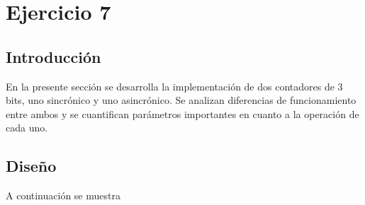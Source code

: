 \documentclass{article}
\begin{document}
\section{Ejercicio 7}

\subsection{Introducci\'on}
\noindent
En la presente sección se desarrolla la implementaci\'on de dos contadores de 3 bits, uno sincr\'onico y uno asincr\'onico. Se analizan diferencias de funcionamiento entre ambos y se cuantifican par\'ametros importantes en cuanto a la operaci\'on de cada uno.


\subsection{Diseño}
\noindent
A continuaci\'on se muestra
\end{document}
